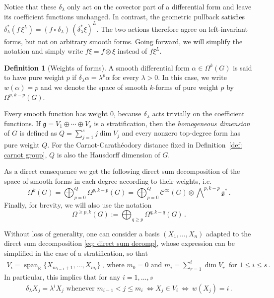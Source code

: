 \documentclass[dvipsnames]{amsart}
\theoremstyle{definition}
\newtheorem{definition}[theorem]{Definition}
\theoremstyle{definition}
\numberwithin{equation}{section}
\newcommand{\C}{\mathcal{C}}
\newcommand{\R}{\mathbb{R}}
\begin{document}
Notice that these \(\delta_\lambda\) only act on the covector part of a
differential form and leave its coefficient functions unchanged. In
contrast, the geometric pullback satisfies $\delta_\lambda^\ast(f\,\xi^L)=(f\circ\delta_\lambda)\,(\delta_\lambda^\ast\xi)^L$.
The two actions therefore agree on left-invariant forms, but not on
arbitrary smooth forms. Going forward, we will simplify the notation and simply write $f\xi=f\otimes\xi$ instead of $f\xi^L$.
\begin{definition}[Weights of forms]
\label{def: weights of forms}A smooth differential form \(\alpha\in\Omega^k(G)\) is said to have
pure weight \(p\) if $\delta_\lambda\alpha=\lambda^p\alpha$ for every $\lambda>0$.
In this case, we write $w(\alpha)=p$ and we denote the space of smooth \(k\)-forms of pure weight \(p\) by $\Omega^{p,k-p}(G)$.

Every smooth function has weight \(0\), because
\(\delta_\lambda\) acts trivially on the coefficient functions.
If $\mathfrak g=V_1\oplus\cdots\oplus V_s$
is a stratification, then the \textit{homogeneous dimension} of \(G\) is defined as $Q
=
\sum_{j=1}^s j\dim V_j$ and every nonzero top-degree form has pure weight \(Q\). For the
Carnot-Carathéodory distance fixed in
Definition~\ref{def: carnot group}, \(Q\) is also the Hausdorff
dimension of \(G\).

As a direct consequence we get the following direct sum decomposition of the space of smooth forms in each degree according to their weights, i.e.
\[
\Omega^k(G)
=
\bigoplus_{p=0}^Q\Omega^{p,k-p}(G)=\bigoplus_{p=0}^Q\C^\infty(G)\otimes\bigwedge\nolimits^{p,k-p}\mathfrak{g}^\ast\,.
\]
Finally, for brevity, we will also use the notation
\[
\Omega^{\geq p,k}(G)
:=
\bigoplus_{q\geq p}\Omega^{q,k-q}(G)\,.
\]
\end{definition}
Without loss of generality, one can consider a basis $(X_1,\ldots,X_n)$ adapted to the direct sum decomposition \eqref{eq: direct sum decomp}, whose expression can be simplified in the case of a stratification, so that
\begin{align*}
V_i=\operatorname{span}_\R\{X_{m_{i-1}+1},\ldots,X_{m_i}\}\ , \ \text{where }m_0=0\text{ and }m_i=\sum_{r=1}^i\operatorname{dim}V_r\ \text{ for }1\le i\le s\,.
\end{align*}
In particular, this implies that for any $i=1,\ldots,s$
\begin{align*}
    \delta_\lambda X_j=\lambda^iX_j \text{ whenever }m_{i-1}<j\le m_i\ \Longleftrightarrow X_j\in V_i\ \Longleftrightarrow\ w(X_j)=i\,.
\end{align*}
\end{document}
